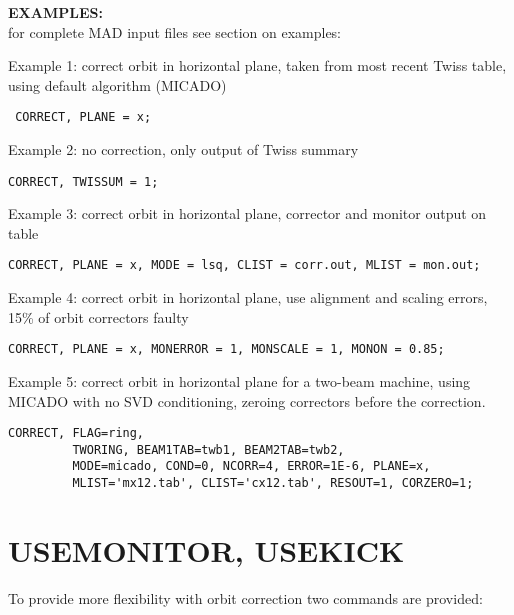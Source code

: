 {\bf EXAMPLES:}\\ 
for complete MAD input files see section on examples:

Example 1: correct orbit in horizontal plane, taken from most recent
Twiss table, using default algorithm (MICADO)
\begin{verbatim}
 CORRECT, PLANE = x; 
\end{verbatim}

Example 2: no correction, only output of Twiss summary 
\begin{verbatim}
CORRECT, TWISSUM = 1; 
\end{verbatim}

Example 3: correct orbit in horizontal plane, corrector and monitor
output on table 
\begin{verbatim}
CORRECT, PLANE = x, MODE = lsq, CLIST = corr.out, MLIST = mon.out;   
\end{verbatim}

Example 4: correct orbit in horizontal plane, use alignment and scaling
errors, 15\% of orbit correctors faulty
\begin{verbatim}
CORRECT, PLANE = x, MONERROR = 1, MONSCALE = 1, MONON = 0.85; 
\end{verbatim}

Example 5: correct orbit in horizontal plane for a two-beam machine,
using MICADO with no SVD conditioning, zeroing correctors before the
correction. 
\begin{verbatim}
CORRECT, FLAG=ring,
         TWORING, BEAM1TAB=twb1, BEAM2TAB=twb2,
         MODE=micado, COND=0, NCORR=4, ERROR=1E-6, PLANE=x,
         MLIST='mx12.tab', CLIST='cx12.tab', RESOUT=1, CORZERO=1;
\end{verbatim}




%
\section{USEMONITOR, USEKICK}
\label{sec:activate}
To provide more flexibility with orbit correction two commands are
provided:  


